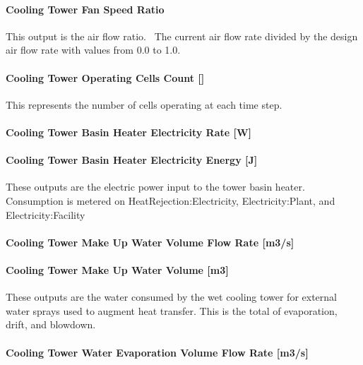 \paragraph{Cooling Tower Fan Speed Ratio}\label{cooling-tower-fan-speed-ratio}

This output is the air flow ratio.~ The current air flow rate divided by the design air flow rate with values from 0.0 to 1.0.

\paragraph{Cooling Tower Operating Cells Count {[]}}\label{cooling-tower-operating-cells-count-2}

This represents the number of cells operating at each time step.

\paragraph{Cooling Tower Basin Heater Electricity Rate {[}W{]}}\label{cooling-tower-basin-heater-electric-power-w-2}

\paragraph{Cooling Tower Basin Heater Electricity Energy {[}J{]}}\label{cooling-tower-basin-heater-electric-energy-j-2}

These outputs are the electric power input to the tower basin heater. Consumption is metered on HeatRejection:Electricity, Electricity:Plant, and Electricity:Facility

\paragraph{Cooling Tower Make Up Water Volume Flow Rate {[}m3/s{]}}\label{cooling-tower-make-up-water-volume-flow-rate-m3s-2}

\paragraph{Cooling Tower Make Up Water Volume {[}m3{]}}\label{cooling-tower-make-up-water-volume-m3-2}

These outputs are the water consumed by the wet cooling tower for external water sprays used to augment heat transfer. This is the total of evaporation, drift, and blowdown.

\paragraph{Cooling Tower Water Evaporation Volume Flow Rate {[}m3/s{]}}\label{cooling-tower-water-evaporation-volume-flow-rate-m3s-2}

